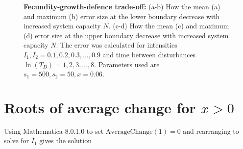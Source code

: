 \documentclass[preprint,10pt,reqno]{amsart}
\begin{document}
\begin{figure}[th]
  \label{fig:fullapprox}
   \caption{\textbf{Fecundity-growth-defence trade-off:} (a-b)  How the mean (a) and maximum (b) error size at the lower boundary decrease with increased system capacity $N$. (c-d) How the mean (c) and maximum (d) error size at the upper boundary decrease with increased system capacity $N$. The error was calculated for intensities $I_1,I_2=0.1,0.2,0.3,...,0.9$ and time between disturbances $\ln(T_D)=1,2,3,...,8.$ Parameters used are $s_1=500,s_2=50,x=0.06$.}
    \end{figure}
 
 \section{Roots of average change for $x>0$}
 Using Mathematica 8.0.1.0 to set $\text{AverageChange}(1)=0$ and rearranging to solve for $I_1$ gives the solution
\end{document}
